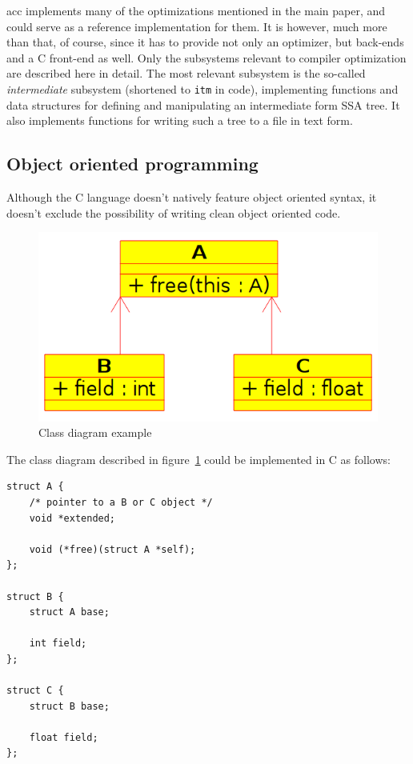 \documentclass[12pt, a4paper]{article}
\begin{document}
  acc implements many of the optimizations mentioned in the main paper, and could
serve as a reference implementation for them. It is however, much more than that,
of course, since it has to provide not only an optimizer, but back-ends and a C
front-end as well. Only the subsystems relevant to compiler optimization are
described here in detail. The most relevant subsystem is the so-called
\textit{intermediate} subsystem (shortened to \verb+itm+ in code), implementing
functions and data structures for defining and manipulating an intermediate form
SSA tree. It also implements functions for writing such a tree to a file in text
form.

  \subsection{Object oriented programming}
Although the C language doesn't natively feature object oriented syntax, it doesn't
exclude the possibility of writing clean object oriented code.

\begin{figure}[h]
\begin{center}
\includegraphics[resolution=256]{ABC.png}
\caption{Class diagram example}
\label{fig:abc}
\end{center}
\end{figure}

The class diagram described in figure~\ref{fig:abc} could be implemented in
C as follows:

\begin{lstlisting}
struct A {
	/* pointer to a B or C object */
	void *extended;

	void (*free)(struct A *self);
};

struct B {
	struct A base;

	int field;
};

struct C {
	struct B base;

	float field;
};
\end{lstlisting}
\end{document}
